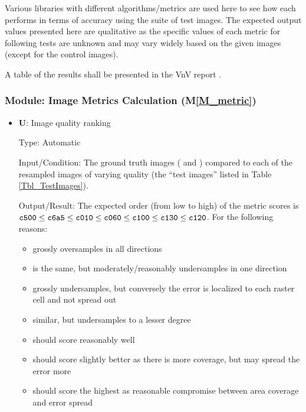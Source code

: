 \documentclass[12pt, titlepage]{article}
\newcommand{\mref}[1]{M\ref{#1}}
\newcounter{testnum} %
\newcounter{unittestnum} %
\begin{document}
Various libraries with different algorithms/metrics are used here to see how each
performs in terms of accuracy using the suite of test images.
The expected output values presented here are qualitative as the specific values
of each metric for following tests are unknown and may vary widely
based on the given images (except for the control images).

A table of the results shall be presented in the VnV report \cite{VnV_report}.



\subsubsection{Module: Image Metrics Calculation (\mref{M_metric})}

\begin{itemize}

\item{\textbf{U\theunittestnum \label{U_metric7}}:
Image quality ranking}

Type: Automatic

Input/Condition: The ground truth images ( and ) compared to each of
  the resampled images of varying quality (the ``test images''
  listed in Table \ref{Tbl_TestImages}).


Output/Result: The expected order (from low to high) of the metric scores is
$
\texttt{c500} \le \texttt{c6a5} \le \texttt{c010} \le \texttt{c060} \le
\texttt{c100} \le \texttt{c130} \le \texttt{c120}
$.
For the following reasons:
\begin{itemize}
  \item {} grossly oversamples in all directions
  \item {} is the same, but moderately/reasonably undersamples in one direction
  \item {} grossly undersamples, but conversely
    the error is localized to each raster cell and not spread out
  \item {} similar, but undersamples to a lesser degree
  \item {} should score reasonably well
  \item {} should score slightly better as there is more coverage, but may spread 
    the error more
  \item {} should score the highest as reasonable compromise between area coverage
    and error spread
\end{itemize}



\end{itemize}
\end{document}
